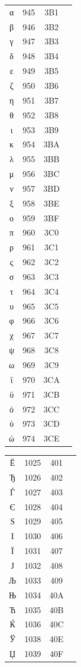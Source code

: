 ﻿\documentclass[10pt]{article}
\begin{document}
\begin{tabular}{crcl}
α&945&3B1&\\
β&946&3B2&\\
γ&947&3B3&\\
δ&948&3B4&\\
ε&949&3B5&\\
ζ&950&3B6&\\
η&951&3B7&\\
θ&952&3B8&\\
ι&953&3B9&\\
κ&954&3BA&\\
λ&955&3BB&\\
μ&956&3BC&\\
ν&957&3BD&\\
ξ&958&3BE&\\
ο&959&3BF&\\
π&960&3C0&\\
ρ&961&3C1&\\
ς&962&3C2&\\
σ&963&3C3&\\
τ&964&3C4&\\
υ&965&3C5&\\
φ&966&3C6&\\
χ&967&3C7&\\
ψ&968&3C8&\\
ω&969&3C9&\\
ϊ&970&3CA&\\
ϋ&971&3CB&\\
ό&972&3CC&\\
ύ&973&3CD&\\
ώ&974&3CE&\\
\end{tabular}

\begin{tabular}{crcl}
Ё&1025&401&\\
Ђ&1026&402&\\
Ѓ&1027&403&\\
Є&1028&404&\\
Ѕ&1029&405&\\
І&1030&406&\\
Ї&1031&407&\\
Ј&1032&408&\\
Љ&1033&409&\\
Њ&1034&40A&\\
Ћ&1035&40B&\\
Ќ&1036&40C&\\
Ў&1038&40E&\\
Џ&1039&40F&\\
\end{tabular}
\end{document}
